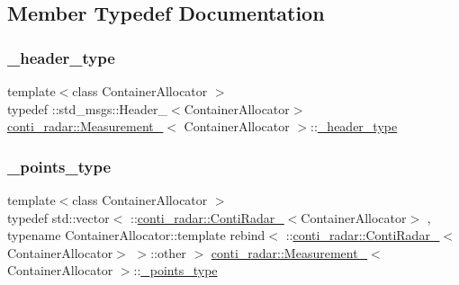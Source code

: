 \subsection{Member Typedef Documentation}
\mbox{\label{structconti__radar_1_1Measurement___af08d17198291be87e84f45ef07e9155f}} 
\subsubsection{\texorpdfstring{\+\_\+header\+\_\+type}{\_header\_type}}
{\footnotesize\ttfamily template$<$class Container\+Allocator $>$ \\
typedef \+::std\+\_\+msgs\+::\+Header\+\_\+$<$Container\+Allocator$>$ \hyperlink{structconti__radar_1_1Measurement__}{conti\+\_\+radar\+::\+Measurement\+\_\+}$<$ Container\+Allocator $>$\+::\hyperlink{structconti__radar_1_1Measurement___af08d17198291be87e84f45ef07e9155f}{\+\_\+header\+\_\+type}}

\mbox{\label{structconti__radar_1_1Measurement___ad4384c3a255ac0bd1ba83addc0dafd71}} 
\subsubsection{\texorpdfstring{\+\_\+points\+\_\+type}{\_points\_type}}
{\footnotesize\ttfamily template$<$class Container\+Allocator $>$ \\
typedef std\+::vector$<$ \+::\hyperlink{structconti__radar_1_1ContiRadar__}{conti\+\_\+radar\+::\+Conti\+Radar\+\_\+}$<$Container\+Allocator$>$ , typename Container\+Allocator\+::template rebind$<$ \+::\hyperlink{structconti__radar_1_1ContiRadar__}{conti\+\_\+radar\+::\+Conti\+Radar\+\_\+}$<$Container\+Allocator$>$ $>$\+::other $>$ \hyperlink{structconti__radar_1_1Measurement__}{conti\+\_\+radar\+::\+Measurement\+\_\+}$<$ Container\+Allocator $>$\+::\hyperlink{structconti__radar_1_1Measurement___ad4384c3a255ac0bd1ba83addc0dafd71}{\+\_\+points\+\_\+type}}

